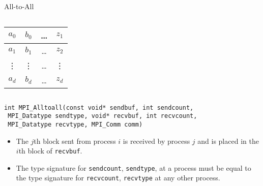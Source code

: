 \documentclass[xcolor={svgnames,usenames}]{beamer}
\begin{document}
\begin{frame}[fragile]{All-to-All}
\begin{columns}
\begin{column}{0.5\textwidth}
	\hspace{1em}\begin{tabular}{|c|c|c|c|}
	\toprule
	$a_0$ & $b_0$ & \ldots & $z_1$ \\
	\midrule
	$a_1$ & $b_1$ & \ldots & $z_2$ \\
	\midrule
	\vdots & \vdots & \ldots & \vdots \\
	\midrule
	$a_d$ & $b_d$ & \ldots & $z_d$ \\
	\midrule
	\end{tabular}
	\end{column}
\end{columns}
\vspace{0.5em}
\begin{verbatim}
int MPI_Alltoall(const void* sendbuf, int sendcount,
 MPI_Datatype sendtype, void* recvbuf, int recvcount, 
 MPI_Datatype recvtype, MPI_Comm comm)
\end{verbatim}
\begin{itemize}
	\item The $j$th block sent from process $i$ is received by process $j$ and is placed in the $i$th block of \texttt{recvbuf}.
	\item The type signature for \texttt{sendcount}, \texttt{sendtype}, at a process must be equal to
	the type signature for \texttt{recvcount}, \texttt{recvtype} at any other process.
\end{itemize}
\end{frame}
\end{document}
